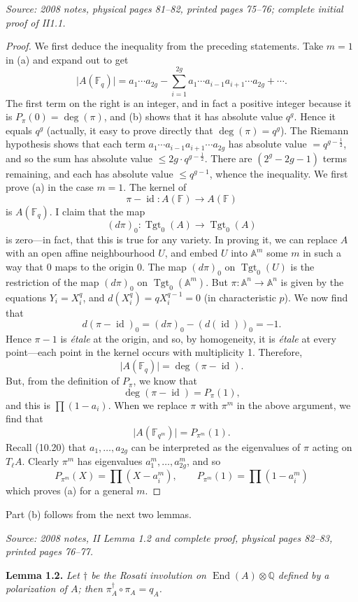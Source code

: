 \documentclass[11pt]{article}
\DeclareMathOperator{\AVEnd}{End}
\DeclareMathOperator{\AVTgt}{Tgt}
\newcommand{\AVQ}{\mathbb{Q}}
\newcommand{\AVF}{\mathbb{F}}
\newcommand{\AVA}{\mathbb{A}}
\newcommand{\AVid}{\operatorname{id}}
\newcommand{\AVsrc}[1]{\par\smallskip\noindent\textit{Source: #1.}\par\smallskip}
\begin{document}
\AVsrc{2008 notes, physical pages 81--82, printed pages 75--76;
complete initial proof of II1.1}
\begin{proof}
We first deduce the inequality from the preceding statements. Take $m=1$
in (a) and expand out to get
\[
\lvert A(\AVF_q)\rvert
=a_1\cdots a_{2g}
-\sum_{i=1}^{2g}a_1\cdots a_{i-1}a_{i+1}\cdots a_{2g}+\cdots.
\]
The first term on the right is an integer, and in fact a positive integer
because it is $P_\pi(0)=\deg(\pi)$, and (b) shows that it has absolute
value $q^g$. Hence it equals $q^g$ (actually, it easy to prove directly
that $\deg(\pi)=q^g$). The Riemann hypothesis shows that each term
$a_1\cdots a_{i-1}a_{i+1}\cdots a_{2g}$ has absolute value
$=q^{g-\frac12}$, and so the sum has absolute value
$\leq2g\cdot q^{g-\frac12}$. There are $(2^g-2g-1)$ terms remaining,
and each has absolute value $\leq q^{g-1}$, whence the inequality.
We first prove (a) in the case $m=1$. The kernel of
\[
\pi-\AVid:A(\AVF)\longrightarrow A(\AVF)
\]
is $A(\AVF_q)$. I claim that the map
\[
(d\pi)_0:\AVTgt_0(A)\longrightarrow\AVTgt_0(A)
\]
is zero---in fact, that this is true for any variety. In proving it, we
can replace $A$ with an open affine neighbourhood $U$, and embed $U$
into $\AVA^m$ some $m$ in such a way that $0$ maps to the origin $0$.
The map $(d\pi)_0$ on $\AVTgt_0(U)$ is the restriction of the map
$(d\pi)_0$ on $\AVTgt_0(\AVA^m)$. But
$\pi:\AVA^n\to\AVA^n$ is given by the equations $Y_i=X_i^q$, and
$d(X_i^q)=qX_i^{q-1}=0$ (in characteristic $p$). We now find that
\[
d(\pi-\AVid)_0=(d\pi)_0-(d(\AVid))_0=-1.
\]
Hence $\pi-1$ is \emph{\'etale} at the origin, and so, by homogeneity,
it is \emph{\'etale} at every point---each point in the kernel occurs
with multiplicity 1. Therefore,
\[
\lvert A(\AVF_q)\rvert=\deg(\pi-\AVid).
\]
But, from the definition of $P_\pi$, we know that
\[
\deg(\pi-\AVid)=P_\pi(1),
\]
and this is $\prod(1-a_i)$. When we replace $\pi$ with $\pi^m$ in the
above argument, we find that
\[
\lvert A(\AVF_{q^m})\rvert=P_{\pi^m}(1).
\]
Recall (10.20) that $a_1,\ldots,a_{2g}$ can be interpreted as the
eigenvalues of $\pi$ acting on $T_\ell A$. Clearly $\pi^m$ has
eigenvalues $a_1^m,\ldots,a_{2g}^m$, and so
\[
P_{\pi^m}(X)=\prod(X-a_i^m),\qquad
P_{\pi^m}(1)=\prod(1-a_i^m)
\]
which proves (a) for a general $m$.
\end{proof}

Part (b) follows from the next two lemmas.

\AVsrc{2008 notes, II Lemma 1.2 and complete proof, physical pages 82--83,
printed pages 76--77}
\noindent\textbf{Lemma 1.2.}
\emph{Let $\dagger$ be the Rosati involution on $\AVEnd(A)\otimes\AVQ$
defined by a polarization of $A$; then $\pi_A^{\dagger}\circ\pi_A=q_A$.}
\end{document}
